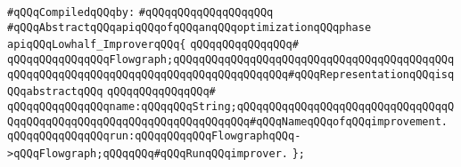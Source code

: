 \label{src/lib/compiler/back/low/code/lowhalf-improver.api}
\newline
\verb|#qQQqCompiledqQQqby:|\newline
\verb|#qQQqqQQqqQQqqQQqqQQq|\newline
\newline
\verb|#qQQqAbstractqQQqapiqQQqofqQQqanqQQqoptimizationqQQqphase|\newline
\newline
\verb|apiqQQqLowhalf_ImproverqQQq{|\newline
\verb|qQQqqQQqqQQqqQQq#|\newline
\verb|qQQqqQQqqQQqqQQqFlowgraph;qQQqqQQqqQQqqQQqqQQqqQQqqQQqqQQqqQQqqQQqqQQqqQQqqQQqqQQqqQQqqQQqqQQqqQQqqQQqqQQqqQQqqQQq#qQQqRepresentationqQQqisqQQqabstractqQQq|\newline
\verb|qQQqqQQqqQQqqQQq#|\newline
\verb|qQQqqQQqqQQqqQQqname:qQQqqQQqString;qQQqqQQqqQQqqQQqqQQqqQQqqQQqqQQqqQQqqQQqqQQqqQQqqQQqqQQqqQQqqQQqqQQqqQQq#qQQqNameqQQqofqQQqimprovement.|\newline
\verb|qQQqqQQqqQQqqQQqrun:qQQqqQQqqQQqFlowgraphqQQq->qQQqFlowgraph;qQQqqQQq#qQQqRunqQQqimprover.|\newline
\verb|};|\newline

